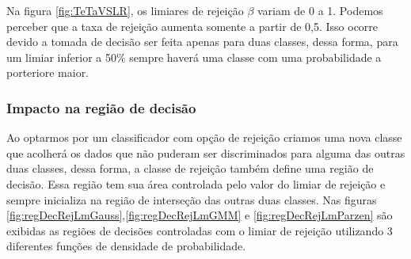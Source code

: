 \documentclass[ 
	article,			%
	11pt,				%
	oneside,			%
	a4paper,			%
	english,			%
	brazil,				%
	]{abntex2}
\begin{document}
Na figura \ref{fig:TeTaVSLR}, os limiares de rejeição $\beta$ variam de 0 a 1.
Podemos perceber que a taxa de rejeição aumenta somente a partir de 0,5. Isso ocorre
devido a tomada de decisão ser feita apenas para duas classes, dessa forma, para
um limiar inferior a 50\% sempre haverá uma classe com uma probabilidade a
porteriore maior.



\subsubsection{Impacto na região de decisão}
Ao optarmos por um classificador com opção de rejeição criamos uma nova classe
que acolherá os dados que não puderam ser discriminados para alguma das outras
duas classes, dessa forma, a classe de rejeição também define uma região de
decisão. Essa região tem sua área controlada pelo valor do limiar de rejeição e
sempre inicializa na região de interseção das outras duas classes. Nas figuras
\ref{fig:regDecRejLmGauss},\ref{fig:regDecRejLmGMM} e
\ref{fig:regDecRejLmParzen} são exibidas as regiões de decisões controladas com o limiar de rejeição utilizando 3 diferentes funções de densidade de probabilidade.

 
\end{document}
